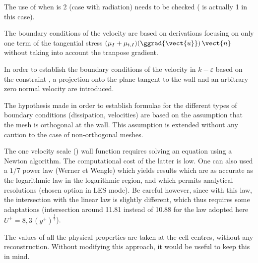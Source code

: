 The use of  when  is 2 (case with
radiation) needs to be checked ( is actually 1 in this case).

The boundary conditions of the velocity are based on derivations
focusing on only one term of the tangential stress
$(\mu_I+\mu_{t,I})(\ggrad{\vect{u}})\,\vect{n}$ without taking
into account the tranpose gradient.

In order to establish the boundary conditions of the velocity in
$k-\varepsilon$ based on the constraint , a projection onto the plane
tangent to the wall and an arbitrary zero normal velocity
are introduced.

The hypothesis made in order to establish formulae for the different types
of boundary conditions (dissipation, velocities) are based on the assumption
that the mesh is orthogonal at the wall. This assumption is extended
without any caution to the case of non-orthogonal meshes.

The one velocity scale () wall function requires
solving an equation using a Newton algorithm.
The computational cost of the latter is low. One can also used
a  $1/7$ power law (Werner et Wengle) which yields results which are as
accurate as the logarithmic law in the logarithmic region, and which permits
analytical resolutions (chosen option in LES mode). Be careful however,
since with this law, the intersection with the linear law is
slightly different, which thus requires some adaptations (intersection
around 11.81 instead of 10.88 for the law adopted here
$U^+=8,3\,(y^+)^\frac{1}{7}$).


The values of all the physical properties are taken at the cell centres,
without any reconstruction. Without modifying this approach, it would be
useful to keep this in mind.

